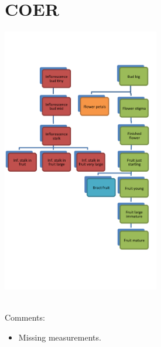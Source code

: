 \documentclass[10pt]{book} %
\begin{document}
\section{COER}
\begin{multicols}{2}
\includegraphics[width=2.7in]{COER.png}
\vfill
\columnbreak

\\Comments:
\begin{itemize}
\item Missing measurements.
\end{itemize}
\end{multicols}

\clearpage
\newpage
\end{document}
